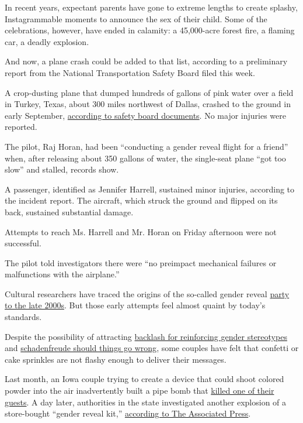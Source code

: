 In recent years, expectant parents have gone to extreme lengths to
create splashy, Instagrammable moments to announce the sex of their
child. Some of the celebrations, however, have ended in calamity: a
45,000-acre forest fire, a flaming car, a deadly explosion.

And now, a plane crash could be added to that list, according to a
preliminary report from the National Transportation Safety Board filed
this week.

A crop-dusting plane that dumped hundreds of gallons of pink water over
a field in Turkey, Texas, about 300 miles northwest of Dallas, crashed
to the ground in early September,
\href{https://dms.ntsb.gov/pubdms/search/TOCPrint.cfm?docketID=62993\&sort=0\&order=1\&searchTitle=\&dorp=0}{according
to safety board documents}. No major injuries were reported.

The pilot, Raj Horan, had been ``conducting a gender reveal flight for a
friend'' when, after releasing about 350 gallons of water, the
single-seat plane ``got too slow'' and stalled, records show.

A passenger, identified as Jennifer Harrell, sustained minor injuries,
according to the incident report. The aircraft, which struck the ground
and flipped on its back, sustained substantial damage.

Attempts to reach Ms. Harrell and Mr. Horan on Friday afternoon were not
successful.

The pilot told investigators there were ``no preimpact mechanical
failures or malfunctions with the airplane.''

Cultural researchers have traced the origins of the so-called gender
reveal
\href{https://www.nytimes3xbfgragh.onion/aponline/2019/11/01/us/ap-us-gender-reveal-explosions.html}{party
to the late 2000s}. But those early attempts feel almost quaint by
today's standards.

Despite the possibility of attracting
\href{https://www.nytimes3xbfgragh.onion/2018/09/25/magazine/should-i-go-to-a-gender-reveal-party.html}{backlash
for reinforcing gender stereotypes} and
\href{https://youtu.be/1LqOjDIJNZE}{schadenfreude should things go
wrong}, some couples have felt that confetti or cake sprinkles are not
flashy enough to deliver their messages.

Last month, an Iowa couple trying to create a device that could shoot
colored powder into the air inadvertently built a pipe bomb that
\href{https://www.nytimes3xbfgragh.onion/2019/10/28/us/gender-reveal-party-death.html}{killed
one of their guests}. A day later, authorities in the state investigated
another explosion of a store-bought ``gender reveal kit,''
\href{https://www.nytimes3xbfgragh.onion/aponline/2019/11/01/us/ap-us-gender-reveal-explosions.html}{according
to The Associated Press}.

